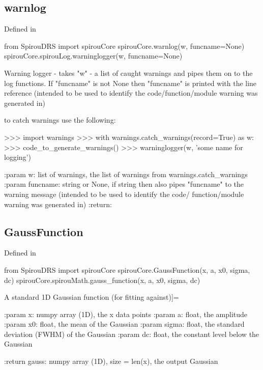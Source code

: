 \noindent\begin{minipage}{\textwidth}
\subsection{warnlog}

Defined in \spirouCore{}

\begin{pythonbox}
from SpirouDRS import spirouCore
spirouCore.warnlog(w, funcname=None)
spirouCore.spirouLog.warninglogger(w, funcname=None)
\end{pythonbox}

\begin{pythondocstring}
Warning logger - takes "w" - a list of caught warnings and pipes them on
to the log functions.
If "funcname" is not None then "funcname" is printed with the line reference
(intended to be used to identify the code/function/module warning was
generated in)

to catch warnings use the following:

>>> import warnings
>>> with warnings.catch_warnings(record=True) as w:
>>>     code_to_generate_warnings()
>>> warninglogger(w, 'some name for logging')

:param w: list of warnings, the list of warnings from
           warnings.catch_warnings
:param funcname: string or None, if string then also pipes "funcname" to the
                 warning message (intended to be used to identify the code/
                 function/module warning was generated in)
:return:
\end{pythondocstring}
\end{minipage}

\noindent\begin{minipage}{\textwidth}
\subsection{GaussFunction}

Defined in \spirouCore{}

\begin{pythonbox}
from SpirouDRS import spirouCore
spirouCore.GaussFunction(x, a, x0, sigma, dc)
spirouCore.spirouMath.gauss_function(x, a, x0, sigma, dc)
\end{pythonbox}

\begin{pythondocstring}
A standard 1D Gaussian function (for fitting against)]=

:param x: numpy array (1D), the x data points
:param a: float, the amplitude
:param x0: float, the mean of the Gaussian
:param sigma: float, the standard deviation (FWHM) of the Gaussian
:param dc: float, the constant level below the Gaussian

:return gauss: numpy array (1D), size = len(x), the output Gaussian
\end{pythondocstring}
\end{minipage}

